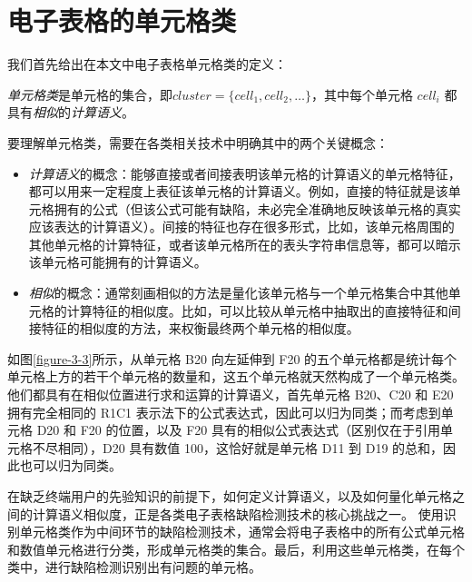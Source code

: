 
\section{电子表格的单元格类}

我们首先给出在本文中电子表格单元格类的定义：

\begin{definition}
    \textit{单元格类}是单元格的集合，即$cluster = \{cell_1, cell_2, \dots\}$，其中每个单元格 $cell_i$ 都具有\textit{相似}的\textit{计算语义}。
\end{definition}

要理解单元格类，需要在各类相关技术中明确其中的两个关键概念：

\begin{itemize}
    \item \textit{计算语义}的概念：能够直接或者间接表明该单元格的计算语义的单元格特征，都可以用来一定程度上表征该单元格的计算语义。例如，直接的特征就是该单元格拥有的公式（但该公式可能有缺陷，未必完全准确地反映该单元格的真实应该表达的计算语义）。间接的特征也存在很多形式，比如，该单元格周围的其他单元格的计算特征，或者该单元格所在的表头字符串信息等，都可以暗示该单元格可能拥有的计算语义。
    \item \textit{相似}的概念：通常刻画相似的方法是量化该单元格与一个单元格集合中其他单元格的计算特征的相似度。比如，可以比较从单元格中抽取出的直接特征和间接特征的相似度的方法，来权衡最终两个单元格的相似度。
\end{itemize}

如图\ref{figure-3-3}所示，从单元格 B20 向左延伸到 F20 的五个单元格都是统计每个单元格上方的若干个单元格的数量和，这五个单元格就天然构成了一个单元格类。他们都具有在相似位置进行求和运算的计算语义，首先单元格 B20、C20 和 E20 拥有完全相同的 R1C1 表示法下的公式表达式，因此可以归为同类；而考虑到单元格 D20 和 F20 的位置，以及 F20 具有的相似公式表达式（区别仅在于引用单元格不尽相同），D20 具有数值 100，这恰好就是单元格 D11 到 D19 的总和，因此也可以归为同类。



在缺乏终端用户的先验知识的前提下，如何定义计算语义，以及如何量化单元格之间的计算语义相似度，正是各类电子表格缺陷检测技术的核心挑战之一\cite{Barowy2018excelint}。
使用识别单元格类作为中间环节的缺陷检测技术，通常会将电子表格中的所有公式单元格和数值单元格进行分类，形成单元格类的集合。最后，利用这些单元格类，在每个类中，进行缺陷检测识别出有问题的单元格。


